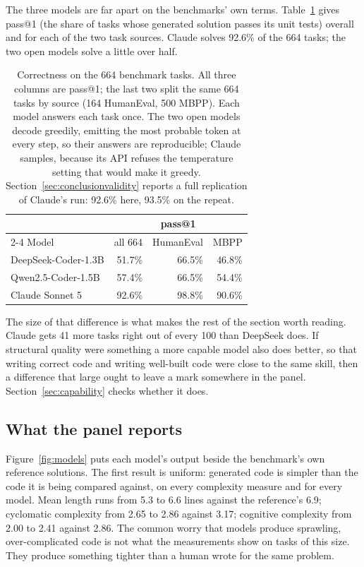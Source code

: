 \documentclass[10pt,a4paper,twocolumn]{article}
\begin{document}
The three models are far apart on the benchmarks' own terms.
Table~\ref{tab:bench} gives pass@1 (the share of tasks whose generated solution
passes its unit tests) overall and for each of the two task sources. Claude
solves 92.6\% of the 664 tasks; the two open models solve a little over half.

\begin{table}[!b]
  \centering
  \small
  \begin{tabular}{lrrr}
  \toprule
  & \multicolumn{3}{c}{pass@1} \\
  \cmidrule(l){2-4}
  Model & all 664 & HumanEval & MBPP \\
  \midrule
  DeepSeek-Coder-1.3B & 51.7\% & 66.5\% & 46.8\% \\
  Qwen2.5-Coder-1.5B  & 57.4\% & 66.5\% & 54.4\% \\
  Claude Sonnet 5     & 92.6\% & 98.8\% & 90.6\% \\
  \bottomrule
  \end{tabular}
  \caption{Correctness on the 664 benchmark tasks. All three columns are pass@1;
  the last two split the same 664 tasks by source (164 HumanEval, 500 MBPP). Each
  model answers each task once. The two open models decode greedily, emitting the
  most probable token at every step, so their answers are reproducible; Claude
  samples, because its API refuses the temperature setting that would make it
  greedy. Section~\ref{sec:conclusionvalidity} reports a full replication of
  Claude's run: 92.6\% here, 93.5\% on the repeat.}
  \label{tab:bench}
\end{table}

The size of that difference is what makes the rest of the section worth reading.
Claude gets 41 more tasks right out of every 100 than DeepSeek does. If
structural quality were something a more capable model also does better, so that
writing correct code and writing well-built code were close to the same skill,
then a difference that large ought to leave a mark somewhere in the panel.
Section~\ref{sec:capability} checks whether it does.

\subsection{What the panel reports}


Figure~\ref{fig:models} puts each model's output beside the benchmark's own
reference solutions. The first result is uniform: generated code is simpler than the code it is being compared against, on every complexity
measure and for every model. Mean length runs from 5.3 to 6.6 lines against the
reference's 6.9; cyclomatic complexity from 2.65 to 2.86 against 3.17; cognitive
complexity from 2.00 to 2.41 against 2.86. The common worry that models produce
sprawling, over-complicated code is not what the measurements show on tasks of
this size. They produce something tighter than a human wrote for the same
problem.
\end{document}
